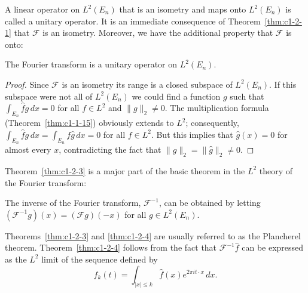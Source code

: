 A linear operator on $L^{2}(E_{n})$ that is an isometry and maps onto
$L^{2}(E_{n})$ is called a unitary operator. It is an immediate consequence of
Theorem~\ref{thm:c1-2-1} that $\mathcal{F}$ is an isometry. Moreover, we have
the additional property that $\mathcal{F}$ is onto:

\begin{theorem}\label{thm:c1-2-3}
The Fourier transform is a unitary operator on $L^{2}(E_{n})$.
\end{theorem}

\begin{proof}
Since $\mathcal{F}$ is an isometry its range is a closed subspace of
$L^{2}(E_{n})$. If this subspace were not all of $L^{2}(E_{n})$ we could find
a function $g$ such that $\int_{E_{n}} \hat{f}g \, dx = 0$ for all
$f \in L^{2}$ and $\|g\|_{2} \neq 0$. The multiplication formula
(Theorem~\ref{thm:c1-1-15}) obviously extends to $L^{2}$; consequently,
$\int_{E_{n}}\hat{f}g\,dx=\int_{E_{n}}f\hat{g}\,dx=0$ for all $f \in L^{2}$.
But this implies that $\hat{g}(x) = 0$ for almost every $x$, contradicting the
fact that $\|g\|_{2} = \|\hat{g}\|_{2} \neq 0$.
\end{proof}

Theorem~\ref{thm:c1-2-3} is a major part of the basic theorem in the $L^{2}$
theory of the Fourier transform:

\begin{theorem}\label{thm:c1-2-4}
The inverse of the Fourier transform, $\mathcal{F}^{-1}$, can be obtained by
letting $(\mathcal{F}^{-1}g)(x) = (\mathcal{F}g)(-x)$ for all
$g \in L^{2}(E_{n})$.
\end{theorem}

Theorems~\ref{thm:c1-2-3} and \ref{thm:c1-2-4} are usually referred to as the
Plancherel theorem. Theorem~\ref{thm:c1-2-4} follows from the fact that
$\mathcal{F}^{-1}\hat{f}$ can be expressed as the $L^{2}$ limit of the
sequence defined by
\begin{equation}\label{eq:c1-2-5}
f_{k}(t)=\int_{|x|\leq k}\hat{f}(x)e^{2\pi i t\cdot x}\,dx.
\end{equation}

